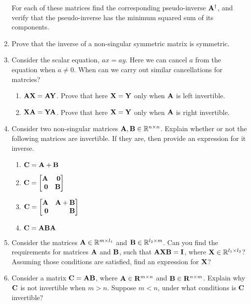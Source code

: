 \documentclass[9pt]{article}
\def\mf{\ensuremath\mathbf}
\def\mb{\ensuremath\mathbb}
\def\bmx{\ensuremath\begin{bmatrix*}[r]}
\def\emx{\ensuremath\end{bmatrix*}}
\begin{document}
\begin{multicols}{2}
\begin{enumerate}[resume]
    For each of these matrices find the corresponding pseudo-inverse $\mf{A}^{\dagger}$, and verify that the pseudo-inverse has the minimum squared sum of its components.

    \item Prove that the inverse of a non-singular symmetric matrix is symmetric.

    \item Consider the scalar equation, $ax = ay$. Here we can cancel $a$ from the equation when $a \neq 0$. When can we carry out similar cancellations for matrcies?
    \begin{enumerate}
        \item $\mf{A}\mf{X} = \mf{A}\mf{Y}$. Prove that here $\mf{X}=\mf{Y}$ only when $\mf{A}$ is left invertible.
        \item $\mf{X}\mf{A} = \mf{Y}\mf{A}$. Prove that here $\mf{X}=\mf{Y}$ only when $\mf{A}$ is right invertible.
    \end{enumerate}

    \item Consider two non-singular matrices $\mf{A}, \mf{B} \in \mb{R}^{n \times n}$. Explain whether or not the following matrices are invertible. If they are, then provide an expression for it inverse.
    \begin{enumerate}
        \item $\mf{C} = \mf{A} + \mf{B}$
        \item $\mf{C} = \bmx \mf{A} & \mf{0}\\\mf{0} & \mf{B}\emx$
        \item $\mf{C} = \bmx \mf{A} & \mf{A} + \mf{B}\\\mf{0} & \mf{B}\emx$
        \item $\mf{C} = \mf{A}\mf{B}\mf{A}$
    \end{enumerate}

    \item Consider the matrices $\mf{A} \in \mb{R}^{m \times l_1}$ and $\mf{B} \in \mb{R}^{l_2 \times m}$. Can you find the requirements for matrices $\mf{A}$ and $\mf{B}$, such that $\mf{A}\mf{X}\mf{B} = \mf{I}$, where $\mf{X} \in \mb{R}^{l_1 \times l_2}$? Assuming those conditions are satisfied,  find an expression for $\mf{X}$?

    \item Consider a matrix $\mf{C} = \mf{A}\mf{B}$, where $\mf{A} \in \mf{R}^{m \times n}$ and $\mf{B} \in \mf{R}^{n \times m}$. Explain why $\mf{C}$ is not invertible when $m > n$. Suppose $m < n$, under what conditions is $\mf{C}$ invertible?


\end{enumerate}
\end{multicols}
\end{document}
